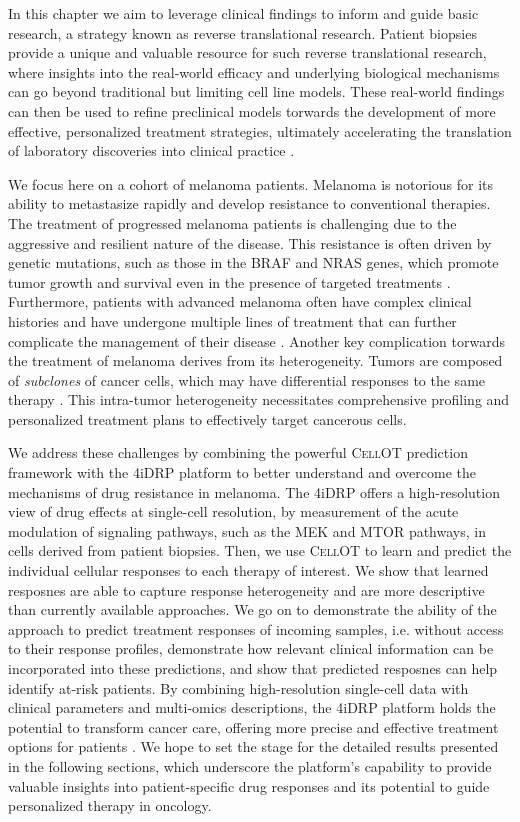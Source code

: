 In this chapter
we aim to leverage clinical findings to inform and guide basic research, a strategy known as reverse translational research.
Patient biopsies provide a unique and valuable resource for such reverse translational research,
where insights into the real-world efficacy and underlying biological mechanisms can go beyond traditional but limiting cell line models.
These real-world findings can then be used to refine preclinical models torwards the development of more effective, personalized treatment strategies, ultimately accelerating the translation of laboratory discoveries into clinical practice \cite{need}.

We focus here on a cohort of melanoma patients.
Melanoma is notorious for its ability to metastasize rapidly and develop resistance to conventional therapies.
The treatment of progressed melanoma patients is challenging due to the aggressive and resilient nature of the disease.
This resistance is often driven by genetic mutations, such as those in the BRAF and NRAS genes, which promote tumor growth and survival even in the presence of targeted treatments \cite{need}.
Furthermore, patients with advanced melanoma often have complex clinical histories and have undergone multiple lines of treatment that can further complicate the management of their disease \cite{need}.
Another key complication torwards the treatment of melanoma derives from its heterogeneity.
Tumors are composed of \emph{subclones} of cancer cells, which may have differential responses to the same therapy \cite{need}.
This intra-tumor heterogeneity necessitates comprehensive profiling and personalized treatment plans to effectively target cancerous cells.

We address these challenges by combining
the powerful \textsc{CellOT} prediction framework with the 4iDRP platform
to better understand and overcome the mechanisms of drug resistance in melanoma.
The 4iDRP offers a high-resolution view of drug effects at single-cell resolution, by measurement of the acute modulation of signaling pathways, such as the MEK and MTOR pathways, in cells derived from patient biopsies.
Then, we use \textsc{CellOT} to learn and predict the individual cellular responses to each therapy of interest.
We show that learned resposnes are able to capture response heterogeneity and are more descriptive than currently available approaches.
We go on to demonstrate the ability of the approach to predict treatment responses of incoming samples, i.e. without access to their response profiles,
demonstrate how relevant clinical information can be incorporated into these predictions,
and show that predicted resposnes can help identify at-risk patients.
By combining high-resolution single-cell data with clinical parameters and multi-omics descriptions, the 4iDRP platform holds the potential to transform cancer care, offering more precise and effective treatment options for patients \cite{need}.
We hope to set the stage for the detailed results presented in the following sections, which underscore the platform's capability to provide valuable insights into patient-specific drug responses and its potential to guide personalized therapy in oncology.
